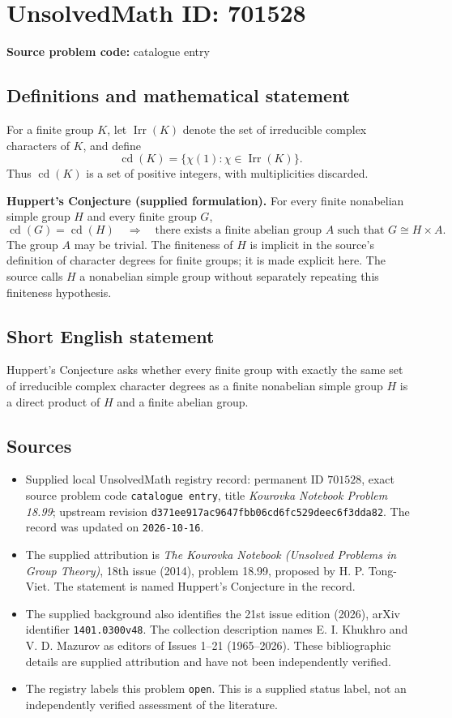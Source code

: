 \documentclass[11pt]{article}
\begin{document}
\section*{UnsolvedMath ID: 701528}
\textbf{Source problem code:} catalogue entry
\subsection{Definitions and mathematical statement}
For a finite group \(K\), let \(\operatorname{Irr}(K)\) denote the set of irreducible complex characters of \(K\), and define
\[
\operatorname{cd}(K)=\{\chi(1):\chi\in\operatorname{Irr}(K)\}.
\]
Thus \(\operatorname{cd}(K)\) is a set of positive integers, with multiplicities discarded.

\textbf{Huppert's Conjecture (supplied formulation).} For every finite nonabelian simple group \(H\) and every finite group \(G\),
\[
\operatorname{cd}(G)=\operatorname{cd}(H)
\quad\Longrightarrow\quad
\text{there exists a finite abelian group }A\text{ such that }G\cong H\times A.
\]
The group \(A\) may be trivial. The finiteness of \(H\) is implicit in the source's definition of character degrees for finite groups; it is made explicit here. The source calls \(H\) a nonabelian simple group without separately repeating this finiteness hypothesis.
\subsection{Short English statement}
Huppert's Conjecture asks whether every finite group with exactly the same set of irreducible complex character degrees as a finite nonabelian simple group \(H\) is a direct product of \(H\) and a finite abelian group.
\subsection{Sources}
\begin{itemize}
\item Supplied local UnsolvedMath registry record: permanent ID \(701528\), exact source problem code \texttt{catalogue entry}, title \emph{Kourovka Notebook Problem 18.99}; upstream revision \texttt{d371ee917ac9647fbb06cd6fc529deec6f3dda82}. The record was updated on \texttt{2026-10-16}.
\item The supplied attribution is \emph{The Kourovka Notebook (Unsolved Problems in Group Theory)}, 18th issue (2014), problem 18.99, proposed by H. P. Tong-Viet. The statement is named Huppert's Conjecture in the record.
\item The supplied background also identifies the 21st issue edition (2026), arXiv identifier \texttt{1401.0300v48}. The collection description names E. I. Khukhro and V. D. Mazurov as editors of Issues 1--21 (1965--2026). These bibliographic details are supplied attribution and have not been independently verified.
\item The registry labels this problem \texttt{open}. This is a supplied status label, not an independently verified assessment of the literature.
\end{itemize}
\end{document}
